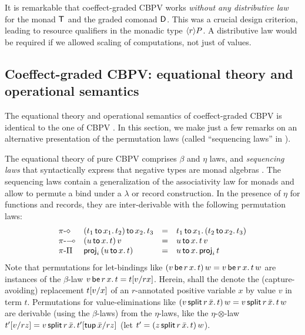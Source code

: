 \documentclass[acmsmall,review,anonymous]{acmart}\settopmatter{printfolios=true,printccs=false,printacmref=false}
\theoremstyle{remark}
\begin{document}
It is remarkable that coeffect-graded CBPV works \emph{without any
  distributive law} \cite{orchard:icfp16}
for the monad $\T$ and the graded comonad $\D$.
%
This was a crucial design criterion, leading to resource qualifiers in
the monadic type $\compty r P$.
%
A distributive law would be required if we allowed scaling of
computations, not just of values.


\subsection{Coeffect-graded CBPV: equational theory and operational semantics}

The equational theory and operational semantics of coeffect-graded
CBPV is identical to the one of CBPV \citep[Fig.~11]{levy:hosc06}.  In
this section, we make just a few remarks on an alternative
presentation of the permutation laws (called ``sequencing laws'' in
\loccit).

The equational theory of pure CBPV comprises $\beta$ and $\eta$ laws,
and \emph{sequencing laws} that syntactically express that negative
types are monad algebras \citep[Fig.~11]{levy:hosc06}.  The sequencing
laws contain a generalization of the associativity law for monads and
allow to permute a bind under a $\lambda$ or record construction.  In
the presence of $\eta$ for functions and records, they are
inter-derivable with the following permutation laws:
\[
\begin{array}{llcl}
\rpi\diamond
  & \bind {x_2} {(\bind {x_1} {t_1} {t_2})} {t_3}
  & = & \bind {x_1} {t_1} {(\bind {x_2} {t_2} {t_3})}
\\
\rpi\lolli
  & \app {(\bind x u t)} v
  & = & \bind x u {\app t v}
\\
\rpi\Pi
  & \proj i {(\bind x  u t)}
  & = & \bind x u {\proj i t}
\end{array}
\]
Note that permutations for let-bindings like
$\app{(\qlet r x v t)}w = \qlet r x v {\app t w}$ are instances of the
$\beta$-law $\qlet r x v t = \qsubst v r x t$.
%
Herein,  shall the denote the
(capture-avoiding) replacement $\subst v x t$ of
an $r$-annotated positive variable $x$
by value $v$ in term $t$.
%
Permutations for value-eliminations like
$\app {(\qsplits r v {\bar x} t)} w = \qsplits r v {\bar x} {\app t
  w}$
are derivable (using the $\beta$-laws) from the $\eta$-laws, like
the $\eta$-$\otimes$-law
$\qsubst{v}{r}{z}{t'} = \qsplits r {v} {\bar x} {\qsubst {\ptup {\bar
      x}} r z {t'}}$
(let $t' = \app {(\qsplits r z {\bar x} t)} w$).
\end{document}
